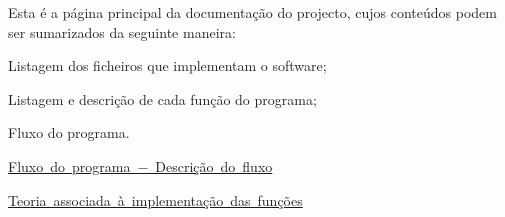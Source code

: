 Esta é a página principal da documentação do projecto, cujos conteúdos podem ser sumarizados da seguinte maneira\+:


\begin{DoxyEnumerate}
\item Listagem dos ficheiros que implementam o software;
\item Listagem e descrição de cada função do programa;
\item Fluxo do programa.
\end{DoxyEnumerate}

\mbox{\hyperlink{workflow}{Fluxo do programa − Descrição do fluxo}}

\mbox{\hyperlink{suporte}{Teoria associada à implementação das funções}} 